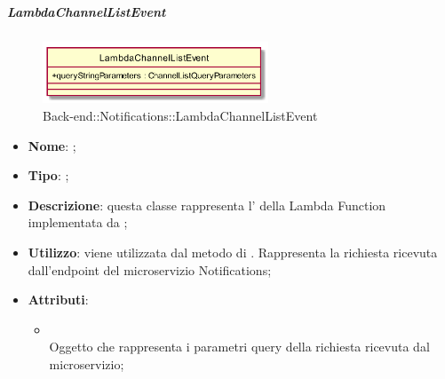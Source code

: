 \hypertarget{LambdaChannelListEvent_label}{\subparagraph{LambdaChannelListEvent}}
\begin{figure}[h]
	\centering
	\includegraphics[width=0.60\textwidth,height=\textheight,keepaspectratio]{images/ClassLambdaChannelListEvent.png}
	\caption{Back-end::Notifications::LambdaChannelListEvent}
\end{figure}
\begin{itemize}
	\item \textbf{Nome}: ;
	\item \textbf{Tipo}: ;
	\item \textbf{Descrizione}: questa classe rappresenta l' della Lambda Function implementata da ;
	\item \textbf{Utilizzo}: viene utilizzata dal metodo  di . Rappresenta la richiesta ricevuta dall'endpoint del microservizio Notifications;
	\item \textbf{Attributi}:
	\begin{itemize}
		\item[]  \\
		Oggetto che rappresenta i parametri query della richiesta ricevuta dal microservizio;
	\end{itemize}
\end{itemize}
\FloatBarrier

